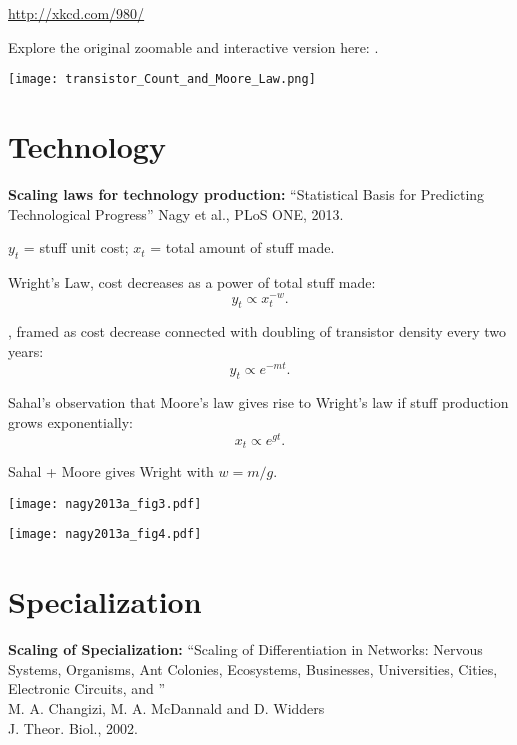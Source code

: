 \url{http://xkcd.com/980/}

Explore the original zoomable and  interactive version here: 
.
\textbf{}

\begin{marginfigure}[]
  \texttt{[image: transistor\_Count\_and\_Moore\_Law.png]}
\end{marginfigure}

\section{Technology}
\small

\textbf{Scaling laws for technology production:}
``Statistical Basis for Predicting Technological Progress\cite{nagy2013a}''
Nagy et al., PLoS ONE, 2013.

$y_t$ = stuff unit cost;
$x_t$ = total amount of stuff made.

Wright's Law, cost decreases as a power of total stuff made:\cite{wright1936a}
$$ 
y_t \propto x_t^{-w}.
$$

,
framed as cost decrease 
connected with doubling of transistor density every two years:\cite{moore1965a}
$$
y_t \propto e^{- m t}. 
$$

Sahal's observation that Moore's law gives rise to Wright's law if
stuff production grows exponentially:\cite{sahal1979a}
$$
x_t \propto e^{g t}.
$$

Sahal + Moore gives Wright with $w = m/g$.

\begin{marginfigure}[]
  \texttt{[image: nagy2013a\_fig3.pdf]}
\end{marginfigure}



\begin{marginfigure}[]
  \texttt{[image: nagy2013a\_fig4.pdf]}
\end{marginfigure}

\section{Specialization}
\textbf{Scaling of Specialization:}
``Scaling of Differentiation in Networks: Nervous Systems, Organisms,
Ant Colonies, Ecosystems, Businesses, Universities, Cities, Electronic
Circuits, and ''\\
M. A. Changizi, M. A. McDannald and D. Widders\cite{changizi2002a}\\
J. Theor. Biol., 2002.\\

